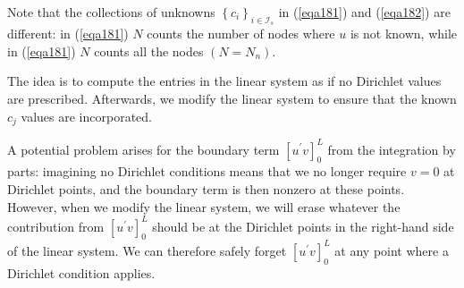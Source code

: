 \documentclass[../main.tex]{subfiles}
\begin{document}
		\noindent Note that the collections of unknowns $\left\{c_{i}\right\}_{i \in \mathcal{I}_{s}}$ in (\ref{eqa181}) and (\ref{eqa182}) are different: in (\ref{eqa181}) $N$ counts the number of nodes where $u$ is not known, while in (\ref{eqa181}) $N$ counts all the nodes $\left(N=N_{n}\right)$.
		
		The idea is to compute the entries in the linear system as if no Dirichlet values are prescribed. Afterwards, we modify the linear system to ensure that the known $c_{j}$ values are incorporated.
		
		A potential problem arises for the boundary term $\left[u^{\prime} v\right]_{0}^{L}$ from the integration by parts: imagining no Dirichlet conditions means that we no longer require $v=0$ at Dirichlet points, and the boundary term is then nonzero at these points. However, when we modify the linear system, we will erase whatever the contribution from $\left[u^{\prime} v\right]_{0}^{L}$ should be at the Dirichlet points in the right-hand side of the linear system. We can therefore safely forget $\left[u^{\prime} v\right]_{0}^{L}$ at any point where a Dirichlet condition applies.\bigbreak
		
\end{document}
